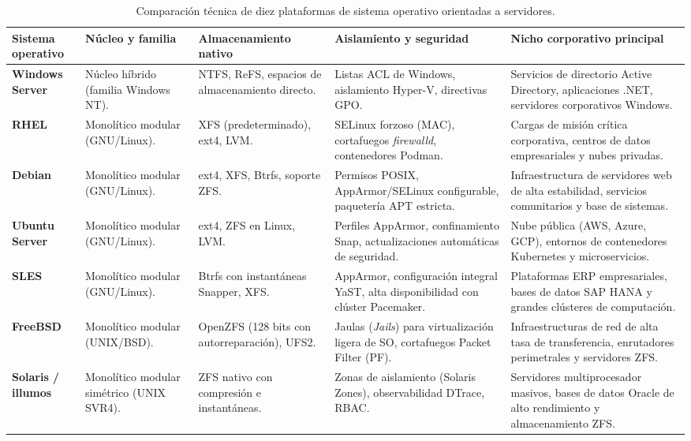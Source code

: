 \documentclass[12pt]{article}
\begin{document}
\begin{table}[H]
\centering
\scriptsize
\renewcommand{\arraystretch}{1.1}
\renewcommand{\tabularxcolumn}[1]{m{#1}}
\setlength{\emergencystretch}{1.5em}
\caption{Comparación técnica de diez plataformas de sistema operativo orientadas a servidores.}
\label{tab:comparativaDiezSistemas}
\begin{tabularx}{\textwidth}{>{\centering\arraybackslash}m{2.3cm} X X X X}
\toprule
\textbf{Sistema operativo} & \textbf{Núcleo y familia} & \textbf{Almacenamiento nativo} & \textbf{Aislamiento y seguridad} & \textbf{Nicho corporativo principal} \\
\midrule
\textbf{Windows Server} & Núcleo híbrido (familia Windows NT). & NTFS, ReFS, espacios de almacenamiento directo. & Listas ACL de Windows, aislamiento Hyper-V, directivas GPO. & Servicios de directorio Active Directory, aplicaciones .NET, servidores corporativos Windows. \\
\addlinespace
\textbf{RHEL} & Monolítico modular (GNU/Linux). & XFS (predeterminado), ext4, LVM. & SELinux forzoso (MAC), cortafuegos \textit{firewalld}, contenedores Podman. & Cargas de misión crítica corporativa, centros de datos empresariales y nubes privadas. \\
\addlinespace
\textbf{Debian} & Monolítico modular (GNU/Linux). & ext4, XFS, Btrfs, soporte ZFS. & Permisos POSIX, AppArmor/SELinux configurable, paquetería APT estricta. & Infraestructura de servidores web de alta estabilidad, servicios comunitarios y base de sistemas. \\
\addlinespace
\textbf{Ubuntu Server} & Monolítico modular (GNU/Linux). & ext4, ZFS en Linux, LVM. & Perfiles AppArmor, confinamiento Snap, actualizaciones automáticas de seguridad. & Nube pública (AWS, Azure, GCP), entornos de contenedores Kubernetes y microservicios. \\
\addlinespace
\textbf{SLES} & Monolítico modular (GNU/Linux). & Btrfs con instantáneas Snapper, XFS. & AppArmor, configuración integral YaST, alta disponibilidad con clúster Pacemaker. & Plataformas ERP empresariales, bases de datos SAP HANA y grandes clústeres de computación. \\
\addlinespace
\textbf{FreeBSD} & Monolítico modular (UNIX/BSD). & OpenZFS (128 bits con autorreparación), UFS2. & Jaulas (\textit{Jails}) para virtualización ligera de SO, cortafuegos Packet Filter (PF). & Infraestructuras de red de alta tasa de transferencia, enrutadores perimetrales y servidores ZFS. \\
\addlinespace
\textbf{Solaris / illumos} & Monolítico modular simétrico (UNIX SVR4). & ZFS nativo con compresión e instantáneas. & Zonas de aislamiento (Solaris Zones), observabilidad DTrace, RBAC. & Servidores multiprocesador masivos, bases de datos Oracle de alto rendimiento y almacenamiento ZFS. \\

\end{tabularx}
\end{table}
\end{document}
